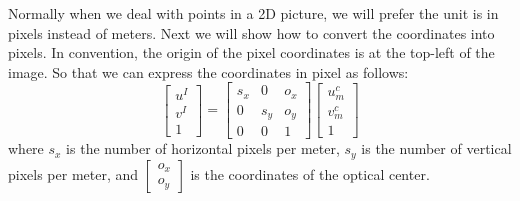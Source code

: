 \documentclass[
]{book}
\theoremstyle{definition}
\theoremstyle{definition}
\theoremstyle{definition}
\theoremstyle{definition}
\theoremstyle{remark}
\begin{document}
Normally when we deal with points in a 2D picture, we will prefer the unit is in pixels instead of meters. Next we will show how to convert the coordinates into pixels. In convention, the origin of the pixel coordinates is at the top-left of the image. So that we can express the coordinates in pixel as follows:
\[\begin{bmatrix} u^I\\v^I\\1 \end{bmatrix} = \begin{bmatrix} s_x &0 &o_x \\ 0 &s_y &o_y\\ 0 &0 &1\end{bmatrix} \begin{bmatrix} u_m^c\\v_m^c\\1 \end{bmatrix}\]
where \(s_x\) is the number of horizontal pixels per meter, \(s_y\) is the number of vertical pixels per meter, and \(\begin{bmatrix} o_x\\o_y\end{bmatrix}\) is the coordinates of the optical center.
\end{document}
